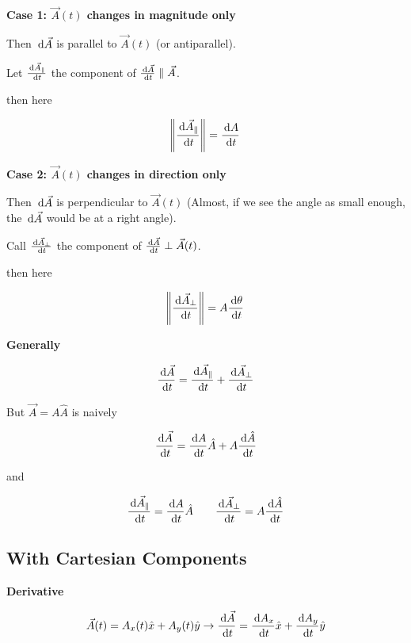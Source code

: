 \textbf{Case 1: $\vec A(t)$ changes in magnitude only}

Then $\D \vec A$ is parallel to $\vec A(t)$ (or antiparallel).

Let $\frac{\D \vec A_\parallel}{\D t}$ the component of $\frac{\D \vec A}{\D t} \parallel \vec A$.

then here

\begin{equation}
	\norm{\frac{\D \vec A_\parallel}{\D t}} = \frac{\D A}{\D t}
\end{equation}

\textbf{Case 2: $\vec A(t)$ changes in direction only}

Then $\D \vec A$ is perpendicular to $\vec A(t)$ (Almost, if we see the angle as small enough, the $\D \vec A$ would be at a right angle).

Call $\frac{\D \vec A_\perp}{\D t}$ the component of $\frac{\D \vec A}{\D t} \perp \vec A(t)$.

then here

\begin{equation}
	\norm{\frac{\D \vec A_\perp}{\D t}} = A \frac{\D \theta}{\D t}
\end{equation}

\textbf{Generally}

\begin{equation}
	\frac{\D \vec A}{\D t} = \frac{\D \vec A_\parallel}{\D t} + \frac{\D \vec A_\perp}{\D t}
\end{equation}

But $\vec A = A \hat A$ is naively

\begin{equation}
	\frac{\D \vec A}{\D t} = \frac{\D A}{\D t} \hat A + A \frac{\D \hat A}{\D t}
\end{equation}

and

\begin{equation}
	\frac{\D \vec A_\parallel}{\D t} = \frac{\D A}{\D t} \hat A \qquad \frac{\D \vec A_\perp}{\D t} = A \frac{\D \hat A}{\D t}
\end{equation}

\subsection{With Cartesian Components}

\textbf{Derivative}

\begin{equation}
	\vec A(t) = A_x(t) \hat x + A_y(t) \hat y \to \frac{\D \vec A}{\D t} = \frac{\D A_x}{\D t} \hat x + \frac{\D A_y}{\D t} \hat y
\end{equation}

